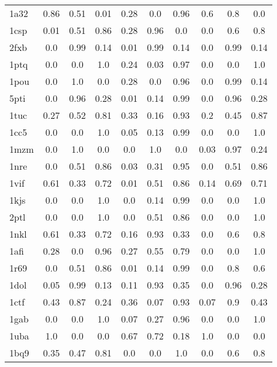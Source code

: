 \documentclass[a4paper,20pt,notitlepage,openbib]{article}
\begin{document}
\begin{table}[htbp]
\begin{center}
\begin{tabular}{| l | c c c | c c c | c c c |}
  1a32 &   0.86 &   0.51 &   0.01 &   0.28 &   0.0 &   0.96 &   0.6 &   0.8 &   0.0 \\
  1csp &   0.01 &   0.51 &   0.86 &   0.28 &   0.96 &   0.0 &   0.0 &   0.6 &   0.8 \\
  2fxb &   0.0 &   0.99 &   0.14 &   0.01 &   0.99 &   0.14 &   0.0 &   0.99 &   0.14 \\
  1ptq &   0.0 &   0.0 &   1.0 &   0.24 &   0.03 &   0.97 &   0.0 &   0.0 &   1.0 \\
  1pou &   0.0 &   1.0 &   0.0 &   0.28 &   0.0 &   0.96 &   0.0 &   0.99 &   0.14 \\
  5pti &   0.0 &   0.96 &   0.28 &   0.01 &   0.14 &   0.99 &   0.0 &   0.96 &   0.28 \\
  1tuc &   0.27 &   0.52 &   0.81 &   0.33 &   0.16 &   0.93 &   0.2 &   0.45 &   0.87 \\
  1cc5 &   0.0 &   0.0 &   1.0 &   0.05 &   0.13 &   0.99 &   0.0 &   0.0 &   1.0 \\
  1mzm &   0.0 &   1.0 &   0.0 &   0.0 &   1.0 &   0.0 &   0.03 &   0.97 &   0.24 \\
  1nre &   0.0 &   0.51 &   0.86 &   0.03 &   0.31 &   0.95 &   0.0 &   0.51 &   0.86 \\
  1vif &   0.61 &   0.33 &   0.72 &   0.01 &   0.51 &   0.86 &   0.14 &   0.69 &   0.71 \\
  1kjs &   0.0 &   0.0 &   1.0 &   0.0 &   0.14 &   0.99 &   0.0 &   0.0 &   1.0 \\
  2ptl &   0.0 &   0.0 &   1.0 &   0.0 &   0.51 &   0.86 &   0.0 &   0.0 &   1.0 \\
  1nkl &   0.61 &   0.33 &   0.72 &   0.16 &   0.93 &   0.33 &   0.0 &   0.6 &   0.8 \\
  1afi &   0.28 &   0.0 &   0.96 &   0.27 &   0.55 &   0.79 &   0.0 &   0.0 &   1.0 \\
  1r69 &   0.0 &   0.51 &   0.86 &   0.01 &   0.14 &   0.99 &   0.0 &   0.8 &   0.6 \\
  1dol &   0.05 &   0.99 &   0.13 &   0.11 &   0.93 &   0.35 &   0.0 &   0.96 &   0.28 \\
  1ctf &   0.43 &   0.87 &   0.24 &   0.36 &   0.07 &   0.93 &   0.07 &   0.9 &   0.43 \\
  1gab &   0.0 &   0.0 &   1.0 &   0.07 &   0.27 &   0.96 &   0.0 &   0.0 &   1.0 \\
  1uba &   1.0 &   0.0 &   0.0 &   0.67 &   0.72 &   0.18 &   1.0 &   0.0 &   0.0 \\
  1bq9 &   0.35 &   0.47 &   0.81 &   0.0 &   0.0 &   1.0 &   0.0 &   0.6 &   0.8 \\

\end{tabular}
\end{center}
\end{table}
\end{document}
